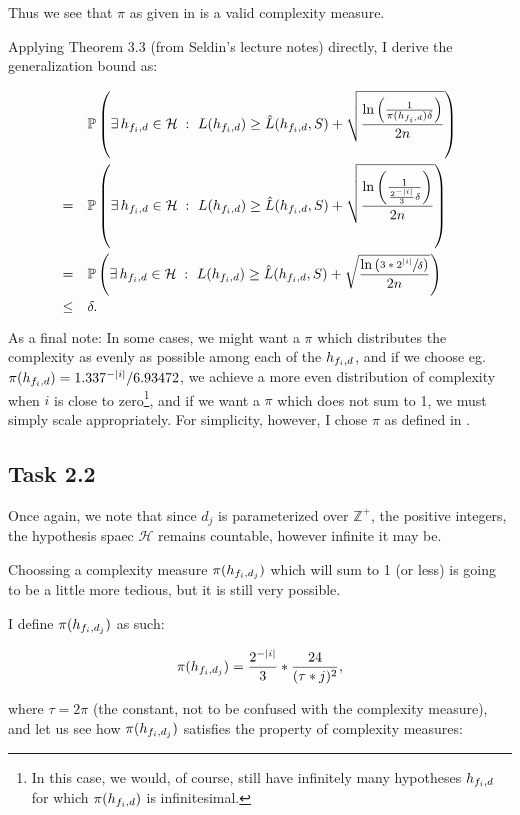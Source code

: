 Thus we see that $\pi$ as given in  is a valid
complexity measure.

Applying Theorem 3.3 (from Seldin's lecture notes) directly, I derive the
generalization bound as:

\begin{alignat*}{3}
  &\mathbb P \left(\exists\, h_{f_{i}, d} \in \mathcal H\; :\ L(h_{f_{i}, d}) \geq \hat{L}(h_{f_{i}, d}, S) + \sqrt{\frac{\ln \left(\frac{1}{\pi(h_{f_{i}, d})\delta}\right)}{2n}}\right)\\
  =\quad &\mathbb P \left(\exists\, h_{f_{i}, d} \in \mathcal H\; :\ L(h_{f_{i}, d}) \geq \hat{L}(h_{f_{i}, d}, S) + \sqrt{\frac{\ln \left(\frac{1}{\frac{2^{-|i|}}{3}\delta}\right)}{2n}}\right)\\
  =\quad &\mathbb P \left(\exists\, h_{f_{i}, d} \in \mathcal H\; :\ L(h_{f_{i}, d}) \geq \hat{L}(h_{f_{i}, d}, S) +
  \sqrt{\frac{\ln \left(\sfrac{3 * 2^{|i|}}{ \delta}\right)}{2n}}\right)\\
  \leq \quad &\delta.\\
\end{alignat*}

As a final note: In some cases, we might want a $\pi$ which distributes the
complexity as evenly as possible among each of the $h_{f_{i}, d}$, and if we choose eg.
$\pi(h_{f_{i}, d}) = 1.337^{-|i|} / 6.93472$, we achieve a more even distribution of
complexity when $i$ is close to zero\footnote{In this case, we would, of course,
still have infinitely many hypotheses $h_{f_{i}, d}$ for which $\pi(h_{f_{i}, d})$ is
infinitesimal.}, and if we want a $\pi$ which does not sum to 1, we must simply
scale appropriately. For simplicity, however, I chose $\pi$ as defined in
.


\newpage
\subsection{Task 2.2}

Once again, we note that since $d_j$ is parameterized over $\mathbb Z^+$, the
positive integers, the hypothesis spaec $\mathcal H$ remains countable, however
infinite it may be.

Choossing a complexity measure $\pi(h_{f_{i}, d_{j}})$ which will sum to 1 (or less) is
going to be a little more tedious, but it is still very possible.

I define $\pi(h_{f_{i}, d_{j}})$ as such:

\begin{align*}
  \pi(h_{f_{i}, d_{j}}) = \frac{2^{-|i|}}{3} * \frac{24}{(\tau * j)^2},
\end{align*}

where $\tau = 2\pi$ (the constant, not to be confused with the complexity
measure), and let us see how $\pi(h_{f_{i}, d_{j}})$ satisfies the property of complexity
measures:

